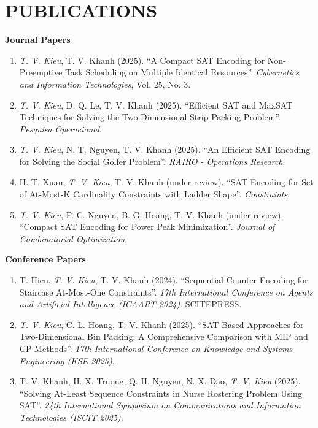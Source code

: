 \documentclass[a4paper,10pt]{extarticle}
\begin{document}
\section*{PUBLICATIONS}
\noindent
\textbf{Journal Papers}
\begin{enumerate}[leftmargin=*]
    \item \textit{T. V. Kieu}, T. V. Khanh (2025). ``A Compact SAT Encoding for Non-Preemptive Task Scheduling on Multiple Identical Resources''. \textit{Cybernetics and Information Technologies}, Vol. 25, No. 3.
    
    \item \textit{T. V. Kieu}, D. Q. Le, T. V. Khanh (2025). ``Efficient SAT and MaxSAT Techniques for Solving the Two-Dimensional Strip Packing Problem''. \textit{Pesquisa Operacional}.
    
    \item \textit{T. V. Kieu}, N. T. Nguyen, T. V. Khanh (2025). ``An Efficient SAT Encoding for Solving the Social Golfer Problem''. \textit{RAIRO - Operations Research}.
    
    \item H. T. Xuan, \textit{T. V. Kieu}, T. V. Khanh (under review). ``SAT Encoding for Set of At-Most-K Cardinality Constraints with Ladder Shape''. \textit{Constraints}.
    
    \item \textit{T. V. Kieu}, P. C. Nguyen, B. G. Hoang, T. V. Khanh (under review). ``Compact SAT Encoding for Power Peak Minimization''. \textit{Journal of Combinatorial Optimization}.
\end{enumerate}

\noindent
\textbf{Conference Papers}
\begin{enumerate}[leftmargin=*, resume]
    \item T. Hieu, \textit{T. V. Kieu}, T. V. Khanh (2024). ``Sequential Counter Encoding for Staircase At-Most-One Constraints''. \textit{17th International Conference on Agents and Artificial Intelligence (ICAART 2024)}. SCITEPRESS.
    
    \item \textit{T. V. Kieu}, C. L. Hoang, T. V. Khanh (2025). ``SAT-Based Approaches for Two-Dimensional Bin Packing: A Comprehensive Comparison with MIP and CP Methods''. \textit{17th International Conference on Knowledge and Systems Engineering (KSE 2025)}.
    
    \item T. V. Khanh, H. X. Truong, Q. H. Nguyen, N. X. Dao, \textit{T. V. Kieu} (2025). ``Solving At-Least Sequence Constraints in Nurse Rostering Problem Using SAT''. \textit{24th International Symposium on Communications and Information Technologies (ISCIT 2025)}.
\end{enumerate}
\end{document}
